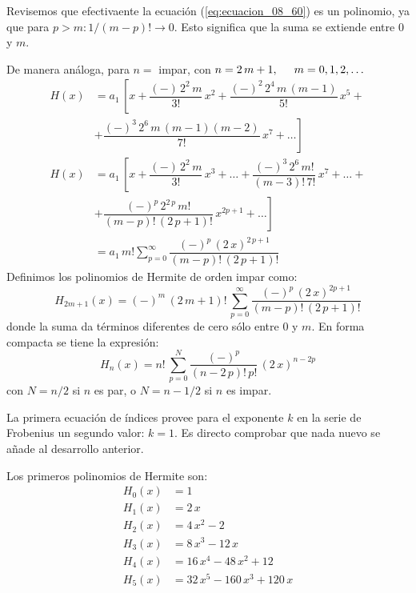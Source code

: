 Revisemos que efectivaente la ecuación (\ref{eq:ecuacion_08_60}) es un polinomio, ya que para $p > m : 1 / (m-p)! \to 0$. Esto significa que la suma se extiende entre $0$ y $m$.
\par
De manera análoga, para $n=$ impar, con $n = 2 \, m + 1, \hspace{0.5cm} m=0, 1, 2, \ldots$
\begin{align*}
H(x) & = a_{1} \, \left[ x + \dfrac{(-) \, 2^{2} \, m}{3!} \, x^{2} + \dfrac{(-)^{2} \, 2^{4} \, m \, (m - 1)}{5!} \, x^{5} + \right. \\
& + \left. \dfrac{(-)^{3} \, 2^{6} \, m \, (m-1)(m-2)}{7!} \, x^{7} + \ldots \right] \\[1em]
H(x) & = a_{1}\, \left[ x + \dfrac{(-)\, 2^{2}\, m}{3!} \, x^{3} + \ldots + \dfrac{(-)^{3} \, 2^{6}\, m!}{(m-3)! \, 7!} \, x^{7} + \ldots + \right. \\[0.5em]
&+  \left. \dfrac{(-)^{p} \, 2^{2 \, p} \, m!}{(m-p)! \, (2\, p + 1)!} \, x^{2p+1} + \ldots \right] \\[0.5em]
& = a_{1} \, m! \sum_{p=0}^{\infty} \dfrac{(-)^{p}\, (2\, x)^{2\, p+1}}{(m-p)! \, (2\, p + 1)!}  
\end{align*}
Definimos los polinomios de Hermite de orden impar como:
\begin{equation}
H_{2m+1} (x) = (-)^{m} \, (2 \, m + 1)! \, \sum_{p=0}^{\infty} \dfrac{(-)^{p} \, (2 \, x)^{2p+1}}{(m-p)! \, (2 \, p + 1)!}
\label{eq:ecuacion_08_61}
\end{equation}
donde la suma da términos diferentes de cero sólo entre $0$ y $m$. En forma compacta se tiene la expresión:
\begin{equation}
\boxed{H_{n}(x) = n! \, \sum_{p=0}^{N} \dfrac{(-)^{p}}{(n - 2 \, p)! \, p!} \, (2 \, x)^{n-2p}}
\label{eq:ecuacion_08_62}
\end{equation}
con $N=n/2$ si $n$ es par, o $N=n-1/2$ si $n$ es impar.
\par
La primera ecuación de índices provee para el exponente $k$ en la serie de Frobenius un segundo valor: $k = 1$. Es directo comprobar que nada nuevo se añade al desarrollo anterior.
\par
Los primeros polinomios de Hermite son:
\begin{align*}
H_{0}(x) &= 1 \\
H_{1}(x) &= 2 \, x \\
H_{2}(x) &= 4 \, x^{2} - 2 \\
H_{3}(x) &= 8 \, x^{3} - 12 \, x \\
H_{4}(x) &= 16 \, x^{4} - 48 \, x^{2} + 12 \\
H_{5}(x) &= 32 \, x^{5} - 160 \, x^{3} + 120 \, x
\end{align*}
